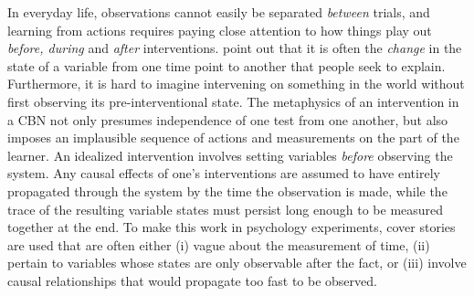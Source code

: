 \documentclass{cambridge7A}%
\newcommand{\ttodo}[2][]{\vspace{0.1cm} \hfil \todo[caption={\textbf{TG}}, size=\footnotesize, color = orange, inline, #1]{#2}}
\def\citeapos#1{\citeauthor{#1}'s (\citeyear{#1})}
\DeclareMathOperator*{\Do}{do}
\begin{document}
In everyday life, observations cannot easily be separated \emph{between} trials, and learning from actions requires paying close attention to how things play out \emph{before, during} and \emph{after} interventions.  
\cite{rottman2012causal} point out that it is often the \emph{change} in the state of a variable from one time point to another that people seek to explain.  Furthermore, it is hard to imagine intervening on something in the world without first observing its pre-interventional state.  The metaphysics of an intervention in a CBN not only presumes independence of one test from one another, but also imposes an implausible sequence of actions and measurements on the part of the learner.  An idealized intervention involves setting variables \emph{before} observing the system.  Any causal effects of one's interventions are assumed to have entirely propagated through the system by the time the observation is made, while the trace of the resulting variable states must persist long enough to be measured together at the end.  %
To make this work in psychology experiments, cover stories are used that are often either (i) vague about the measurement of time, (ii) pertain to variables whose states are only observable after the fact, or (iii) involve causal relationships that would propagate too fast to be observed.  %
\end{document}
